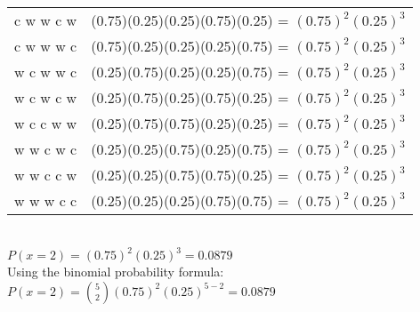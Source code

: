 \documentclass[a4paper]{article}
\begin{document}
\begin{shaded}
\begin{itemize}
\begin{tabularx}{0.7\textwidth}{ 
            | >{\hsize=0.25\hsize \centering\arraybackslash}X 
            | >{\hsize=0.75\hsize \centering\arraybackslash}X | }
            c w w c w & (0.75)(0.25)(0.25)(0.75)(0.25) = $(0.75)^2(0.25)^3$\\
            c w w w c & (0.75)(0.25)(0.25)(0.25)(0.75) = $(0.75)^2(0.25)^3$\\
            w c w w c & (0.25)(0.75)(0.25)(0.25)(0.75) = $(0.75)^2(0.25)^3$\\
            w c w c w & (0.25)(0.75)(0.25)(0.75)(0.25) = $(0.75)^2(0.25)^3$\\
            w c c w w & (0.25)(0.75)(0.75)(0.25)(0.25) = $(0.75)^2(0.25)^3$\\
            w w c w c & (0.25)(0.25)(0.75)(0.25)(0.75) = $(0.75)^2(0.25)^3$\\
            w w c c w & (0.25)(0.25)(0.75)(0.75)(0.25) = $(0.75)^2(0.25)^3$\\
            w w w c c & (0.25)(0.25)(0.25)(0.75)(0.75) = $(0.75)^2(0.25)^3$\\
            \hline
        \end{tabularx}
        \vspace{1mm}\\
        $P(x = 2)  = (0.75)^2(0.25)^3 = 0.0879$\\
        Using the binomial probability formula: $P(x = 2) = \binom{5}{2}(0.75)^2(0.25)^{5-2} = 0.0879$
    \end{itemize}
\end{shaded}
\end{document}
